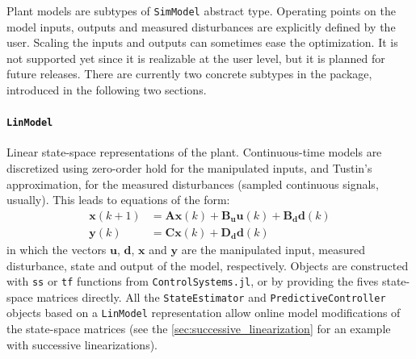 Plant models are subtypes of \texttt{SimModel} abstract type. Operating points on the model inputs, outputs and measured disturbances are explicitly defined by the user. Scaling the inputs and outputs can sometimes ease the optimization. It is not supported yet since it is realizable at the user level, but it is planned for future releases. There are currently two concrete subtypes in the package, introduced in the following two sections. 

\paragraph{\textnormal{\texttt{LinModel}}}
Linear state-space representations of the plant. Continuous-time models are discretized using zero-order hold for the manipulated inputs, and Tustin's approximation, for the measured disturbances (sampled continuous signals, usually). This leads to equations of the form:
\begin{subequations}
\begin{align}
    \mathbf{x}(k+1) &= \mathbf{A x}(k) + \mathbf{B_u u}(k) + \mathbf{B_d d}(k) \\
    \mathbf{y}(k)   &= \mathbf{C x}(k) + \mathbf{D_d d}(k)
\end{align}
\end{subequations}
in which the vectors $\mathbf{u}$, $\mathbf{d}$, $\mathbf{x}$ and $\mathbf{y}$ are the manipulated input, measured disturbance, state and output of the model, respectively. Objects are constructed with \texttt{ss} or \texttt{tf} functions from \texttt{ControlSystems.jl}, or by providing the fives state-space matrices directly. All the \texttt{StateEstimator} and \texttt{PredictiveController} objects based on a \texttt{LinModel} representation allow online model modifications of the state-space matrices (see the \cref{sec:successive_linearization} for an example with successive linearizations).

